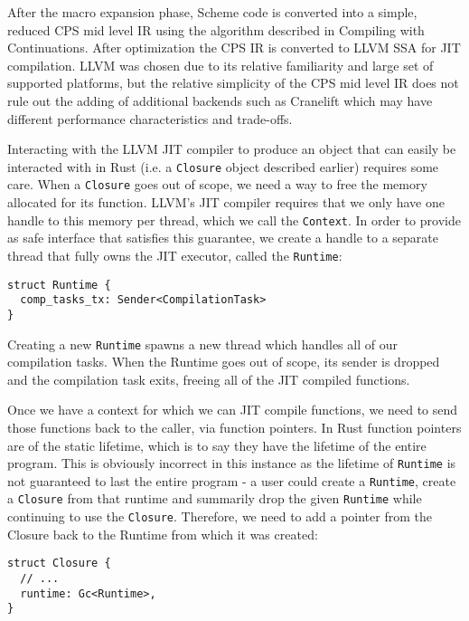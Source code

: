 \documentclass[sigplan,review,anonymous]{acmart}
\begin{document}
After the macro expansion phase, Scheme code is converted into a simple, reduced
CPS mid level IR using the algorithm described in Compiling with
Continuations\cite{cwc}. After optimization the CPS IR is converted to
LLVM SSA\cite{llvm} for JIT compilation. LLVM was chosen due to its relative
familiarity and large set of supported platforms, but the relative simplicity of
the CPS mid level IR does not rule out the adding of additional backends such
as Cranelift\cite{cranelift} which may have different performance
characteristics and trade-offs.

Interacting with the LLVM JIT compiler to produce an object that can easily be
interacted with in Rust (i.e. a \texttt{Closure} object described earlier)
requires some care. When a \texttt{Closure} goes out of scope, we need a way to
free the memory allocated for its function. LLVM's JIT compiler requires that
we only have one handle to this memory per thread, which we call the
\texttt{Context}\cite{context}. In order to provide as safe interface that
satisfies this guarantee, we create a handle to a separate thread that fully owns
the JIT executor, called the \texttt{Runtime}:

\begin{verbatim}
struct Runtime {
  comp_tasks_tx: Sender<CompilationTask>
}
\end{verbatim}

Creating a new \texttt{Runtime} spawns a new thread which handles all of our
compilation tasks. When the Runtime goes out of scope, its sender is dropped
and the compilation task exits, freeing all of the JIT compiled functions.

Once we have a context for which we can JIT compile functions, we need to send
those functions back to the caller, via function pointers. In Rust function
pointers are of the static lifetime, which is to say they have the lifetime of
the entire program. This is obviously incorrect in this instance as the lifetime
of \texttt{Runtime} is not guaranteed to last the entire program - a user could
create a \texttt{Runtime}, create a \texttt{Closure} from that runtime and
summarily drop the given \texttt{Runtime} while continuing to use the
\texttt{Closure}. Therefore, we need to add a pointer from the Closure back to
the Runtime from which it was created:

\begin{verbatim}
struct Closure {
  // ...
  runtime: Gc<Runtime>,
}
\end{verbatim}
\end{document}
